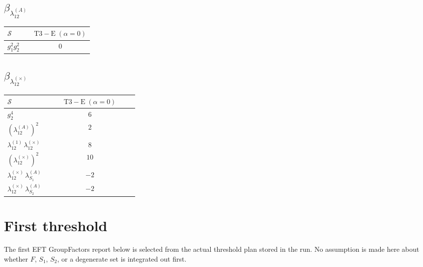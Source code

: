 \documentclass[9pt]{article}
\begin{document}
\subsection*{$ \beta_{\lambda_{12}^{(A)}} $}
\begin{longtable}{@{}p{0.31\linewidth}c@{}}
\toprule
$\mathcal{S}$ & $ \mathrm{T3-E}\;(\alpha=0) $ \\
\midrule
$ g_1^2g_2^2 $ & $ 0 $ \\
\bottomrule
\end{longtable}
\subsection*{$ \beta_{\lambda_{12}^{(\times)}} $}
\begin{longtable}{@{}p{0.31\linewidth}c@{}}
\toprule
$\mathcal{S}$ & $ \mathrm{T3-E}\;(\alpha=0) $ \\
\midrule
$ g_2^4 $ & $ 6 $ \\
$ \left(\lambda_{12}^{(A)}\right)^2 $ & $ 2 $ \\
$ \lambda_{12}^{(1)}\,\lambda_{12}^{(\times)} $ & $ 8 $ \\
$ \left(\lambda_{12}^{(\times)}\right)^2 $ & $ 10 $ \\
$ \lambda_{12}^{(\times)}\,\lambda_{S_1}^{(A)} $ & $ -2 $ \\
$ \lambda_{12}^{(\times)}\,\lambda_{S_2}^{(A)} $ & $ -2 $ \\
\bottomrule
\end{longtable}
\section*{First threshold}
The first EFT GroupFactors report below is selected from the actual threshold plan stored in the run.  No assumption is made here about whether $F$, $S_1$, $S_2$, or a degenerate set is integrated out first.
\end{document}
